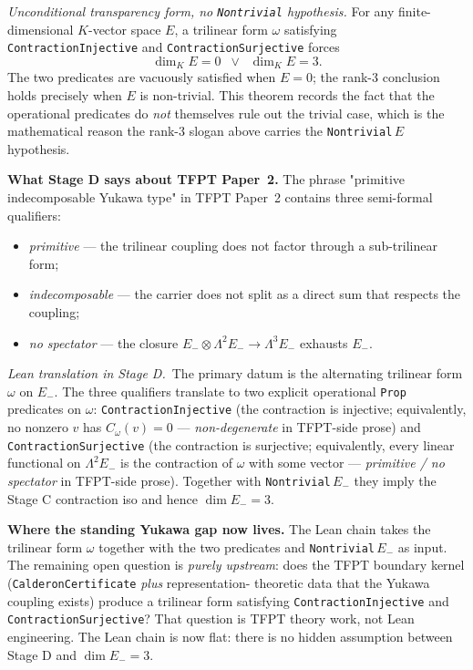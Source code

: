 \documentclass[11pt,a4paper]{article}
\begin{document}
\begin{theorem}
\emph{Unconditional transparency form, no \texttt{Nontrivial}
hypothesis.} For any finite-dimensional $K$-vector space $E$,
a trilinear form $\omega$ satisfying \texttt{ContractionInjective}
and \texttt{ContractionSurjective} forces
\[
\dim_K E = 0 \;\;\lor\;\; \dim_K E = 3.
\]
The two predicates are vacuously satisfied when $E = 0$;
the rank-3 conclusion holds precisely when $E$ is non-trivial.
This theorem records the fact that the operational predicates
do \emph{not} themselves rule out the trivial case, which is the
mathematical reason the rank-3 slogan above carries the
\texttt{Nontrivial}\,$E$ hypothesis.
\end{theorem}

\textbf{What Stage D says about TFPT Paper~2.}
The phrase "primitive indecomposable Yukawa type" in TFPT
Paper~2 contains three semi-formal qualifiers:

\begin{itemize}[leftmargin=1.6em, itemsep=0pt]
\item \emph{primitive} --- the trilinear coupling does not
    factor through a sub-trilinear form;
\item \emph{indecomposable} --- the carrier does not split as
    a direct sum that respects the coupling;
\item \emph{no spectator} --- the closure
    $E_- \otimes \Lambda^2 E_- \to \Lambda^3 E_-$ exhausts
    $E_-$.
\end{itemize}

\noindent
\emph{Lean translation in Stage D.}\ The primary datum is the
alternating trilinear form $\omega$ on $E_-$. The three
qualifiers translate to two explicit operational \texttt{Prop}
predicates on $\omega$:
\texttt{ContractionInjective} (the contraction is injective;
equivalently, no nonzero $v$ has $C_\omega(v) = 0$ ---
\emph{non-degenerate} in TFPT-side prose) and
\texttt{ContractionSurjective} (the contraction is surjective;
equivalently, every linear functional on $\Lambda^2 E_-$ is the
contraction of $\omega$ with some vector --- \emph{primitive /
no spectator} in TFPT-side prose). Together with
\texttt{Nontrivial}\,$E_-$ they imply the Stage C contraction
iso and hence $\dim E_- = 3$.

\textbf{Where the standing Yukawa gap now lives.}
The Lean chain takes the trilinear form $\omega$ together with
the two predicates and \texttt{Nontrivial}\,$E_-$ as input.
The remaining open question is \emph{purely upstream}: does the
TFPT boundary kernel
(\texttt{CalderonCertificate} \emph{plus} representation-
theoretic data that the Yukawa coupling exists) produce a
trilinear form satisfying \texttt{ContractionInjective} and
\texttt{ContractionSurjective}? That question is TFPT theory
work, not Lean engineering. The Lean chain is now flat: there is
no hidden assumption between Stage D and $\dim E_- = 3$.
\end{document}
